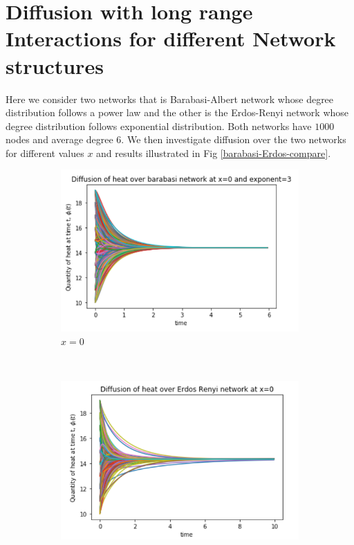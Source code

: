 \documentclass[10pt,a4paper]{article}
\begin{document}
\section{Diffusion with long range Interactions for different Network structures}
Here we consider two networks that is Barabasi-Albert network whose degree distribution follows a power law and the other is the Erdos-Renyi network whose degree distribution follows exponential distribution. Both networks have $1000$ nodes and average degree $6$. We then investigate diffusion over the two networks for different values $x$ and results illustrated in Fig \ref{barabasi-Erdos-compare}.

\begin{figure}[!h]
	\centering
	\begin{subfigure}[b]{0.45\textwidth}
		\includegraphics[width=\textwidth]{images/barabasi-x0.png}
		\caption{$x=0$}
		\label{barabasi-x0}
	\end{subfigure}~
	\begin{subfigure}[b]{0.45\textwidth}
		\includegraphics[width= \textwidth]{images/erdos-x0.png}

\end{subfigure}
\end{figure}
\end{document}
